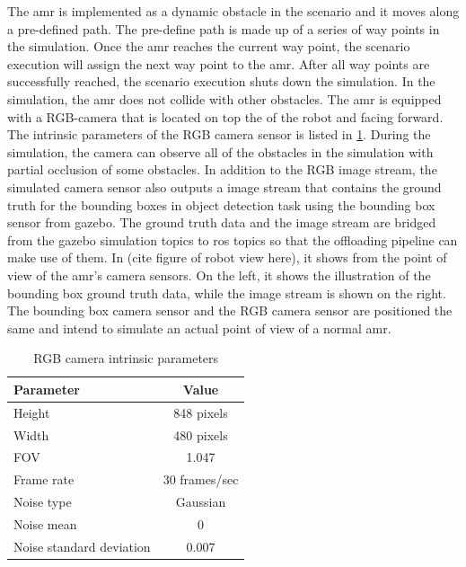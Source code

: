 The \gls{amr} is implemented as a dynamic obstacle in the scenario and it moves along a pre-defined path. The pre-define path is made up of a series of way points in the simulation. Once the \gls{amr} reaches the current way point, the scenario execution will assign the next way point to the \gls{amr}. After all way points are successfully reached, the scenario execution shuts down the simulation. In the simulation, the \gls{amr} does not collide with other obstacles. The \gls{amr} is equipped with a RGB-camera that is located on top the of the robot and facing forward. The intrinsic parameters of the RGB camera sensor is listed in \cref{tab:camera_params}. During the simulation, the camera can observe all of the obstacles in the simulation with partial occlusion of some obstacles. In addition to the RGB image stream, the simulated camera sensor also outputs a image stream that contains the ground truth for the bounding boxes in object detection task using the bounding box sensor from \gls{gazebo}. The ground truth data and the image stream are bridged from the \gls{gazebo} simulation topics to \gls{ros} topics so that the offloading pipeline can make use of them. In (cite figure of robot view here), it shows from the point of view of the \gls{amr}'s camera sensors. On the left, it shows the illustration of the bounding box ground truth data, while the image stream is shown on the right. The bounding box camera sensor and the RGB camera sensor are positioned the same and intend to simulate an actual point of view of a normal \gls{amr}.

\begin{table}[htp]
    \centering
    \begin{tabular}{lc}
    \toprule
    Parameter&                  Value\\
    \midrule
    Height&                     848 pixels\\
    Width&                      480 pixels\\
    FOV&                        1.047\\
    Frame rate&                 30 frames/sec\\
    Noise type&                 Gaussian\\
    Noise mean&                 0\\
    Noise standard deviation&   0.007\\
    \bottomrule
    \end{tabular}
    \caption{RGB camera intrinsic parameters}
    \label{tab:camera_params}
\end{table}

